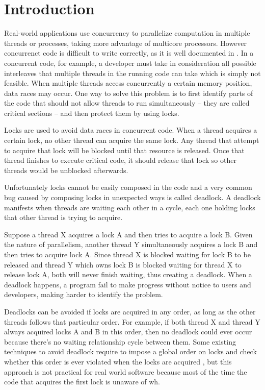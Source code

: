\chapter{Introduction}

Real-world applications use concurrency to parallelize computation in multiple threads or processes, taking more advantage of multicore processors.
However concurrenct code is difficult to write correctly, as it is well documented in \cite{lu}. In a concurrent code, for example, a developer must
take in consideration all possible interleaves that multiple threads in the running code can take which is simply not feasible.
When multiple threads access concurrently a certain memory position, data races may occur.
One way to solve this problem is to first identify parts of the code that should not allow threads to run simultaneously -- they are
called critical sections -- and then protect them by using locks. 

Locks are used to avoid data races in concurrent code. When a thread acquires a certain lock, no other thread can acquire the same lock.
Any thread that attempt to acquire that lock will be blocked until that resource is released. Once that thread finishes to execute critical code,
it should release that lock so other threads would be unblocked afterwards.

Unfortunately locks cannot be easily composed in the code and a very common bug caused by composing locks in unexpected ways is called deadlock.
A deadlock manifests when threads are waiting each other in a cycle, each one holding locks that other thread is trying to acquire.

Suppose a thread X acquires a lock A and then tries to acquire a lock B. Given the nature of parallelism, another thread Y simultaneously acquires
a lock B and then tries to acquire lock A. Since thread X is blocked waiting for lock B to be released and thread Y which owns lock B is blocked
waiting for thread X to release lock A, both will never finish waiting, thus creating a deadlock. When a deadlock happens, a program fail
to make progress without notice to users and developers, making harder to identify the problem.

Deadlocks can be avoided if locks are acquired in any order, as long as the other threads follows that particular order. For example, if both thread X
and thread Y always acquired locks A and B in this order, then no deadlock could ever occur because there's no waiting relationship cycle between them. 
Some existing techniques to avoid deadlock require to impose a global order on locks and check whether this order is ever violated when the locks are acquired \cite{marino},
but this approach is not practical for real world software because most of the time the code that acquires the first lock is unaware of wh.

